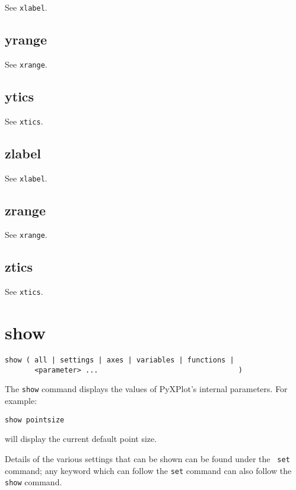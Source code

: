 See {\tt xlabel}.


\subsection{yrange}

See {\tt xrange}.


\subsection{ytics}

See {\tt xtics}.


\subsection{zlabel}

See {\tt xlabel}.


\subsection{zrange}

See {\tt xrange}.


\subsection{ztics}

See {\tt xtics}.


\section{show}

\begin{verbatim}
show ( all | settings | axes | variables | functions |
       <parameter> ...                                 )
\end{verbatim}

The {\tt show} command displays the values of PyXPlot's internal parameters. For
example:

\begin{verbatim}
show pointsize
\end{verbatim}

\noindent will display the current default point size.

Details of the various settings that can be shown can be found under the {\tt
set} command; any keyword which can follow the {\tt set} command can also follow
the {\tt show} command.

